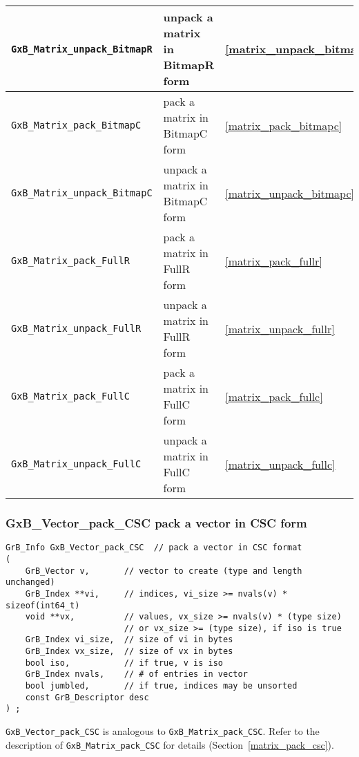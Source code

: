 \documentclass[12pt]{article}
\begin{document}
{\begin{tabular}{lll}
\verb'GxB_Matrix_unpack_BitmapR'  & unpack a matrix in BitmapR form & \ref{matrix_unpack_bitmapr} \\
\hline
\verb'GxB_Matrix_pack_BitmapC'    & pack a matrix in BitmapC form & \ref{matrix_pack_bitmapc} \\
\verb'GxB_Matrix_unpack_BitmapC'  & unpack a matrix in BitmapC form & \ref{matrix_unpack_bitmapc} \\
\hline
\verb'GxB_Matrix_pack_FullR'      & pack a matrix in FullR form & \ref{matrix_pack_fullr} \\
\verb'GxB_Matrix_unpack_FullR'    & unpack a matrix in FullR form & \ref{matrix_unpack_fullr} \\
\hline
\verb'GxB_Matrix_pack_FullC'      & pack a matrix in FullC form & \ref{matrix_pack_fullc} \\
\verb'GxB_Matrix_unpack_FullC'    & unpack a matrix in FullC form & \ref{matrix_unpack_fullc} \\
\hline
\end{tabular}
}

\newpage
\subsubsection{{\sf GxB\_Vector\_pack\_CSC} pack a vector in CSC form}
\label{vector_pack_csc}

\begin{mdframed}[userdefinedwidth=6in]
{\footnotesize
\begin{verbatim}
GrB_Info GxB_Vector_pack_CSC  // pack a vector in CSC format
(
    GrB_Vector v,       // vector to create (type and length unchanged)
    GrB_Index **vi,     // indices, vi_size >= nvals(v) * sizeof(int64_t)
    void **vx,          // values, vx_size >= nvals(v) * (type size)
                        // or vx_size >= (type size), if iso is true
    GrB_Index vi_size,  // size of vi in bytes
    GrB_Index vx_size,  // size of vx in bytes
    bool iso,           // if true, v is iso
    GrB_Index nvals,    // # of entries in vector
    bool jumbled,       // if true, indices may be unsorted
    const GrB_Descriptor desc
) ;
\end{verbatim}
} \end{mdframed}

\noindent
\verb'GxB_Vector_pack_CSC' is analogous to \verb'GxB_Matrix_pack_CSC'.
Refer to the description of \verb'GxB_Matrix_pack_CSC' for details
(Section~\ref{matrix_pack_csc}).
\end{document}
